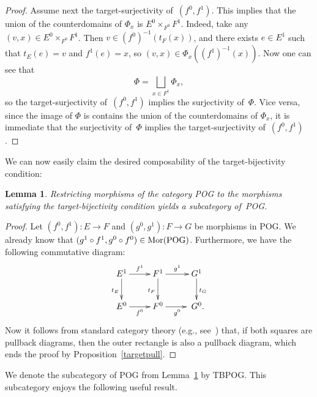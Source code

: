 \documentclass[12pt,times,a4paper]{amsart}
\newtheorem{lemma}[theorem]{Lemma}
\numberwithin{equation}{section}
\numberwithin{equation}{section}
\begin{document}
\begin{proof}
Assume next the target-surjectivity of~$(f^0,f^1)$. This implies that
the union of the counterdomains of $\Phi_x$ is $E^0{\times}_{F^0}F^1$. Indeed, take any
$(v,x)\in E^0{\times}_{F^0}F^1$. Then $v\in (f^0)^{-1}(t_F(x))$, and there exists $e\in E^1$ such that $t_E(e)=v$
and $f^1(e)=x$, so $(v,x)\in \Phi_x((f^1)^{-1}(x))$.
Now one can see that 
\begin{equation}
\Phi=\bigsqcup_{x\in F^1}\Phi_x,
\end{equation}
so the target-surjectivity of~$(f^0,f^1)$ implies the surjectivity of~$\Phi$. Vice versa, since the image of $\Phi$ is
contains  the union of the counterdomains of $\Phi_x$, it is immediate that the surjectivity of~$\Phi$ implies
the target-surjectivity of~$(f^0,f^1)$.
\end{proof}

We can now easily claim the desired composability of the target-bijectivity condition:
\begin{lemma}\label{tbpog}
Restricting morphisms of the category {\rm POG} to the morphisms satisfying
 the  target-bijectivity condition yields a subcategory of~{\rm POG}.
\end{lemma}
\begin{proof}
Let $(f^0,f^1):E\to F$ and $(g^0,g^1):F\to G$ be morphisms in {\rm POG}. 
We already know that $(g^1\circ f^1,g^0\circ f^0)\in {\rm Mor}(\mathrm{POG})$. Furthermore, we have the following 
commutative diagram:
\begin{equation}
\xymatrix{
E^1 \ar[r]^{f^1}
\ar[d]_{t_E}
& F^1 \ar[d]_{t_F} \ar[r]^{g^1} & G^1 \ar[d]^{t_G}\\
E^0 \ar[r]_{f^0}
& F^0 \ar[r]_{g^0} & \phantom{.}G^0.
}
\end{equation}
Now it follows from standard category theory (e.g., see~\cite[Proposition~11.10]{ahs90}) that, 
if both squares are pullback diagrams, then the outer rectangle is also a pullback diagram, which ends the proof
by Proposition~\ref{targetpull}.
\end{proof}

We denote the subcategory of {\rm POG}  from Lemma~\ref{tbpog} by {\rm TBPOG}. This subcategory enjoys the following useful result.
\end{document}
